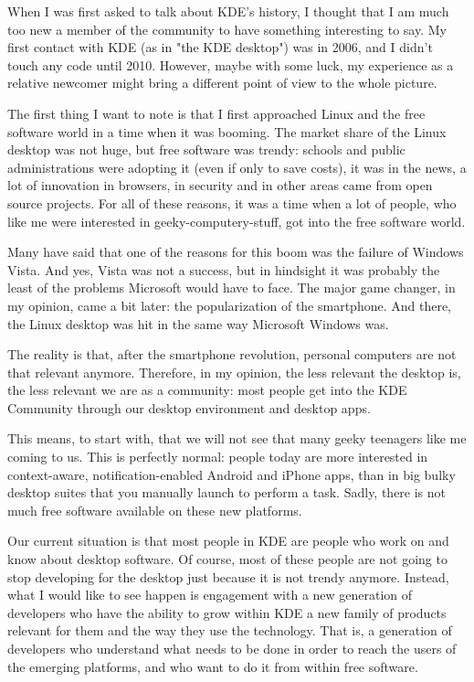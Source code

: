 

\noindent{}When I was first asked to talk about KDE's history, I thought that I am much too new a member of the community to have something interesting to say. My first contact with KDE (as in "the KDE desktop") was in 2006, and I didn't touch any code until 2010. However, maybe with some luck, my experience as a relative newcomer might bring a different point of view to the whole picture.

The first thing I want to note is that I first approached Linux and the free software world in a time when it was booming. The market share of the Linux desktop was not huge, but free software was trendy: schools and public administrations were adopting it (even if only to save costs), it was in the news, a lot of innovation in browsers, in security and in other areas came from open source projects. For all of these reasons, it was a time when a lot of people, who like me were interested in geeky-computery-stuff, got into the free software world.

Many have said that one of the reasons for this boom was the failure of Windows Vista. And yes, Vista was not a success, but in hindsight it was probably the least of the problems Microsoft would have to face. The major game changer, in my opinion, came a bit later: the popularization of the smartphone. And there, the Linux desktop was hit in the same way Microsoft Windows was.

The reality is that, after the smartphone revolution, personal computers are not that relevant anymore. Therefore, in my opinion, the less relevant the desktop is, the less relevant we are as a community: most people get into the KDE Community through our desktop environment and desktop apps. 

This means, to start with, that we will not see that many geeky teenagers like me coming to us. This is perfectly normal: people today are more interested in context-aware, notification-enabled Android and iPhone apps, than in big bulky desktop suites that you manually launch to perform a task. Sadly, there is not much free software available on these new platforms.

Our current situation is that most people in KDE are people who work on and know about desktop software. Of course, most of these people are not going to stop developing for the desktop just because it is not trendy anymore. Instead, what I would like to see happen is engagement with a new generation of developers who have the ability to grow within KDE a new family of products relevant for them and the way they use the technology. That is, a generation of developers who understand what needs to be done in order to reach the users of the emerging platforms, and who want to do it from within free software.

